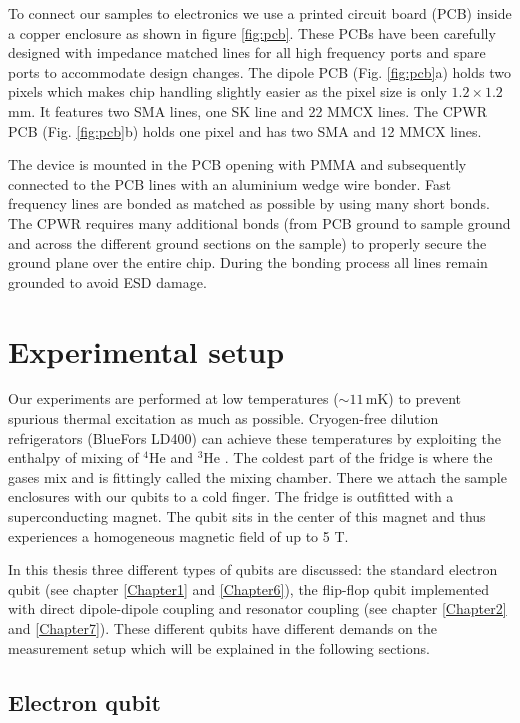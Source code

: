 To connect our samples to electronics we use a printed circuit board (PCB) inside a copper enclosure as shown in figure \ref{fig:pcb}. These PCBs have been carefully designed with impedance matched lines for all high frequency ports and spare ports to accommodate design changes. The dipole PCB (Fig. \ref{fig:pcb}a) holds two pixels which makes chip handling slightly easier as the pixel size is only $1.2\times1.2\,$mm. It features two SMA lines, one SK line and 22 MMCX lines. The CPWR PCB (Fig. \ref{fig:pcb}b) holds one pixel and has two SMA and 12 MMCX lines. 

The device is mounted in the PCB opening with PMMA and subsequently connected to the PCB lines with an aluminium wedge wire bonder. Fast frequency lines are bonded as matched as possible by using many short bonds. The CPWR requires many additional bonds (from PCB ground to sample ground and across the different ground sections on the sample) to properly secure the ground plane over the entire chip. During the bonding process all lines remain grounded to avoid ESD damage. 

\section{Experimental setup} \label{sec:setup}

Our experiments are performed at low temperatures ($\sim 11\,$mK) to prevent spurious thermal excitation as much as possible. Cryogen-free dilution refrigerators (BlueFors LD400) can achieve these temperatures by  exploiting the enthalpy of mixing of $^4$He and $^3$He \cite{BlueforsManual}. The coldest part of the fridge is where the gases mix and is fittingly called the mixing chamber. There we attach the sample enclosures with our qubits to a cold finger. The fridge is outfitted with a superconducting magnet. The qubit sits in the center of this magnet and thus experiences a homogeneous magnetic field of up to 5 T.

In this thesis three different types of qubits are discussed: the standard electron qubit (see chapter \ref{Chapter1} and \ref{Chapter6}), the flip-flop qubit implemented with direct dipole-dipole coupling and resonator coupling (see chapter \ref{Chapter2} and \ref{Chapter7}). These different qubits have different demands on the measurement setup which will be explained in the following sections. 

\subsection{Electron qubit} \label{sec:setup_en}

